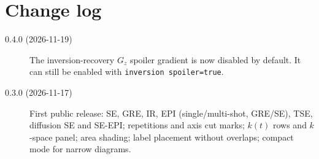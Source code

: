 \documentclass[11pt]{article}
\begin{document}
\section{Change log}
\begin{description}
\item[0.4.0 (2026-11-19)] The inversion-recovery $G_z$ spoiler gradient
  is now disabled by default. It can still be enabled with
  \texttt{inversion spoiler=true}.
\item[0.3.0 (2026-11-17)] First public release: SE, GRE, IR, EPI
  (single/multi-shot, GRE/SE), TSE, diffusion SE and SE-EPI; repetitions and
  axis cut marks; $k(t)$ rows and $k$-space panel; area shading; label
  placement without overlaps; compact mode for narrow diagrams.
\end{description}
\end{document}
